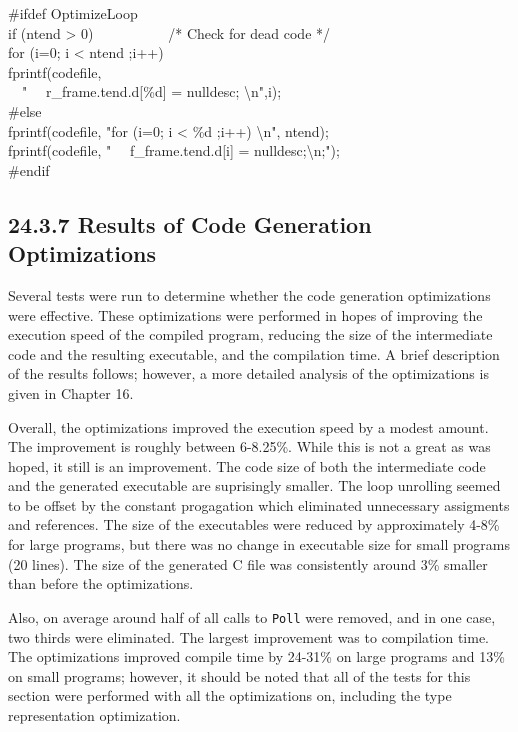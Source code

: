 \goodbreak
\begin{iconcode}
\#ifdef OptimizeLoop\\
if (ntend > 0) \ \ \ \ \ \ \ \ \ \ /* Check for dead code */\\
\>for (i=0; i < ntend ;i++)\\
\>\>fprintf(codefile,\\
\>\>\>\>\ \ " \ \ r\_frame.tend.d[\%d] = nulldesc; {\textbackslash}n",i);\\
\#else\\
fprintf(codefile, "for (i=0; i < \%d ;i++) {\textbackslash}n", ntend);\\
fprintf(codefile, " \ \ f\_frame.tend.d[i] = nulldesc;{\textbackslash}n;");\\
\#endif\\
\end{iconcode}

\subsection[24.3.7 Results of Code Generation Optimizations]{24.3.7 Results of Code Generation Optimizations}

Several tests were run to determine whether the code generation
optimizations were effective. These optimizations were performed in
hopes of improving the execution speed of the compiled program,
reducing the size of the intermediate code and the resulting
executable, and the compilation time. A brief description of the
results follows; however, a more detailed analysis of the
optimizations is given in Chapter 16.


Overall, the optimizations improved the execution speed by a modest
amount. The improvement is roughly between 6-8.25\%.  While this is
not a great as was hoped, it still is an improvement. The code size of
both the intermediate code and the generated executable are
suprisingly smaller. The loop unrolling seemed to be offset by the
constant progagation which eliminated unnecessary assigments and
references. The size of the executables were reduced by approximately
4-8\% for large programs, but there was no change in executable size
for small programs (20 lines). The size of the generated C file was
consistently around 3\% smaller than before the optimizations.


Also, on average around half of all calls to \texttt{Poll} were
removed, and in one case, two thirds were eliminated.  The largest
improvement was to compilation time. The optimizations improved
compile time by 24-31\% on large programs and 13\% on small programs;
however, it should be noted that all of the tests for this section
were performed with all the optimizations on, including the type
representation optimization.

